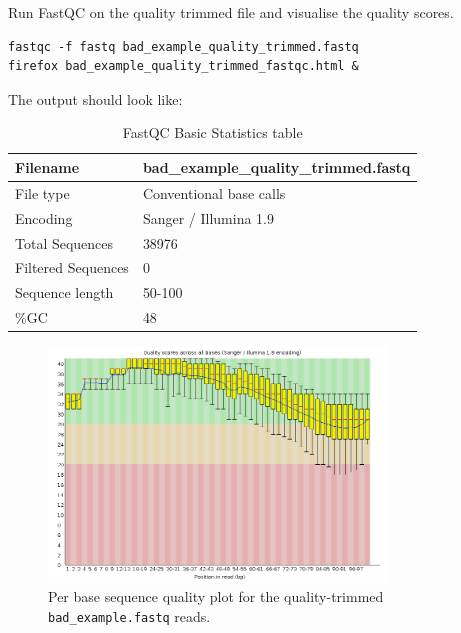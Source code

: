 \begin{steps}
Run FastQC on the quality trimmed file and visualise the quality scores.

\begin{lstlisting}
fastqc -f fastq bad_example_quality_trimmed.fastq
firefox bad_example_quality_trimmed_fastqc.html &
\end{lstlisting}

The output should look like:

\begin{table}[H]
  \centering
  \caption{FastQC Basic Statistics table}
    \begin{tabular}{ll}
    \toprule
    Filename & bad\_example\_quality\_trimmed.fastq\\
    \midrule
    File type & Conventional base calls\\
    Encoding & Sanger / Illumina 1.9\\
    Total Sequences & 38976\\
    Filtered Sequences & 0\\
    Sequence length & 50-100\\
    \%GC & 48\\
    \bottomrule
    \end{tabular}
  \label{tab:badexamplequalitytrimmed}
\end{table}

\begin{figure}[H]
\centering
\includegraphics[width=0.8\textwidth]{ngs-qc/bad_example_quality_trimmed.png}
\caption{Per base sequence quality plot for the quality-trimmed \texttt{bad\_example.fastq} reads.}
\label{fig:bad_example_quality_trimmed_plot}
\end{figure}

\end{steps}

